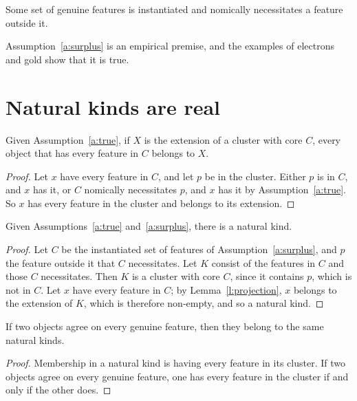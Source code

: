 \documentclass{situationist-preprint}
\begin{document}
\begin{assumption}\label{a:surplus}
Some set of genuine features is instantiated and nomically necessitates a feature outside it.
\end{assumption}

Assumption~\ref{a:surplus} is an empirical premise, and the examples of electrons and gold show that it is true.

\section{Natural kinds are real}\label{s:real}

\begin{lemma}[Projection]\label{l:projection}
Given Assumption~\ref{a:true}, if $X$ is the extension of a cluster with core $C$, every object that has every feature in $C$ belongs to $X$.
\end{lemma}

\begin{proof}
Let $x$ have every feature in $C$, and let $p$ be in the cluster. Either $p$ is in $C$, and $x$ has it, or $C$ nomically necessitates $p$, and $x$ has it by Assumption~\ref{a:true}. So $x$ has every feature in the cluster and belongs to its extension.
\end{proof}

\begin{theorem}[Existence]\label{t:exist}
Given Assumptions~\ref{a:true} and~\ref{a:surplus}, there is a natural kind.
\end{theorem}

\begin{proof}
Let $C$ be the instantiated set of features of Assumption~\ref{a:surplus}, and $p$ the feature outside it that $C$ necessitates. Let $K$ consist of the features in $C$ and those $C$ necessitates. Then $K$ is a cluster with core $C$, since it contains $p$, which is not in $C$. Let $x$ have every feature in $C$; by Lemma~\ref{l:projection}, $x$ belongs to the extension of $K$, which is therefore non-empty, and so a natural kind.
\end{proof}

\begin{proposition}\label{p:real}
If two objects agree on every genuine feature, then they belong to the same natural kinds.
\end{proposition}

\begin{proof}
Membership in a natural kind is having every feature in its cluster. If two objects agree on every genuine feature, one has every feature in the cluster if and only if the other does.
\end{proof}
\end{document}
